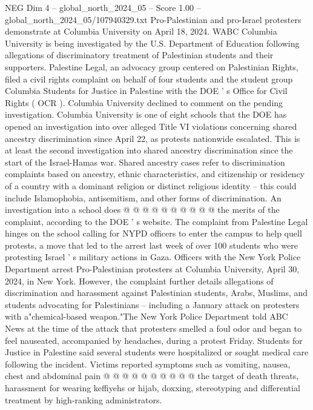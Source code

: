 \begin{textsample}{NEG Dim 4 – global\_north\_2024\_05 – Score 1.00 – global\_north\_2024\_05/107940329.txt}  \label{ex:f4_neg_129}
Pro-Palestinian and pro-Israel protesters demonstrate at Columbia University on April 18, 2024.
WABC Columbia University is being investigated by the U.S.
Department of Education following allegations of discriminatory treatment of Palestinian students and their supporters.
Palestine Legal, an advocacy group centered on Palestinian Rights, filed a civil rights complaint on behalf of four students and the student group Columbia Students for Justice in Palestine with the DOE ' s Office for Civil Rights ( OCR ).
Columbia University declined to comment on the pending investigation.
Columbia University is one of eight schools that the DOE has opened an investigation into over alleged Title VI violations concerning shared ancestry discrimination since April 22, as protests nationwide escalated.
This is at least the second investigation into shared ancestry discrimination since the start of the Israel-Hamas war.
Shared ancestry cases refer to discrimination complaints based on ancestry, ethnic characteristics, and citizenship or residency of a country with a dominant religion or distinct religious identity -- this could include Islamophobia, antisemitism, and other forms of discrimination.
An investigation into a school does @ @ @ @ @ @ @ @ @ @ the merits of the complaint, according to the DOE ' s website.
The complaint from Palestine Legal hinges on the school calling for NYPD officers to enter the campus to help quell protests, a move that led to the arrest last week of over 100 students who were protesting Israel ' s military actions in Gaza.
Officers with the New York Police Department arrest Pro-Palestinian protesters at Columbia University, April 30, 2024, in New York.
However, the complaint further details allegations of discrimination and harassment against Palestinian students, Arabs, Muslims, and students advocating for Palestinians -- including a January attack on protesters with a"chemical-based weapon."The New York Police Department told ABC News at the time of the attack that protesters smelled a foul odor and began to feel nauseated, accompanied by headaches, during a protest Friday.
Students for Justice in Palestine said several students were hospitalized or sought medical care following the incident.
Victims reported symptoms such as vomiting, nausea, chest and abdominal pain @ @ @ @ @ @ @ @ @ @ the target of death threats, harassment for wearing keffiyehs or hijab, doxxing, stereotyping and differential treatment by high-ranking administrators.

\end{textsample}
